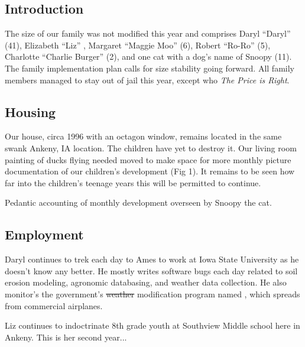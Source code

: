 \documentclass[letterpaper,11pt]{article}
\makeatletter
\newenvironment{figurehere}
  {\def\@captype{figure}}
  {}
\makeatother
\begin{document}
\begin{multicols}{2}

    
\section{Introduction} 

The size of our family was not modified this year and comprises Daryl
\enquote{Daryl} (41), Elizabeth \enquote{Liz} ,
Margaret \enquote{Maggie Moo} (6), Robert \enquote{Ro-Ro} (5), Charlotte
 \enquote{Charlie Burger} (2), and one cat with a dog's name of Snoopy (11). 
The family implementation plan calls for size stability going forward.  All
family members managed to stay out of jail this year, except 
who  
\textit{The Price is Right}. 

   
\subsection{Housing}

Our house, circa 1996 with an octagon window, remains located in the same
swank Ankeny, IA location.  The children have yet to destroy it. Our living
room painting of ducks flying needed moved to make space for more monthly
picture documentation of our children's development (Fig 1).  It remains to
be seen how far into the children's teenage years this will be permitted
to continue.

\begin{figurehere}
    \centering   
    \caption{Pedantic accounting of monthly development overseen by Snoopy the cat.}
   \end{figurehere}


\subsection{Employment}

Daryl continues to trek each day to Ames to work at Iowa State University as
he doesn't know any better.  He mostly writes software bugs each day 
related to soil erosion modeling, agronomic databasing, and weather data
collection.  He also monitor's the government's \sout{weather} modification program
named , which spreads  from commercial
airplanes.

Liz continues to indoctrinate 8th grade youth at Southview Middle school
here in Ankeny.  This is her second year...


\end{multicols}
\end{document}
